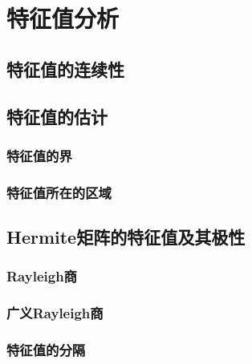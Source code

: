 \chapter{特征值分析}
\label{cha:特征值分析}

\section{特征值的连续性}
\label{sec:特征值的连续性}

\section{特征值的估计}
\label{sec:特征值的估计}

\subsection{特征值的界}
\label{sub:特征值的界}

\subsection{特征值所在的区域}
\label{sub:特征值所在的区域}

\section{Hermite矩阵的特征值及其极性}
\label{sec:Hermite矩阵的特征值及其极性}

\subsection{Rayleigh商}
\label{sub:Rayleigh商}

\begin{definition}
\end{definition}

\subsection{广义Rayleigh商}
\label{sub:广义Rayleigh商}

\begin{definition}
\end{definition}

\begin{definition}
\end{definition}

\subsection{特征值的分隔}
\label{sub:特征值的分隔}

